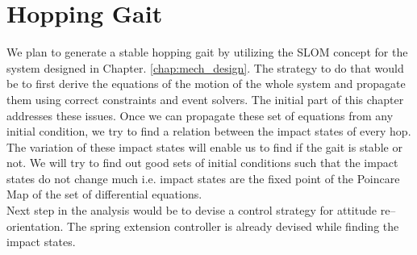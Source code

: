 \chapter{Hopping Gait}
\label{chap:hopping_gait}

We plan to generate a stable hopping gait by utilizing the SLOM concept for the system designed in Chapter. 
\ref{chap:mech_design}. The strategy to do that would be to first derive the equations of the motion of the 
whole system and propagate them using correct constraints and event solvers. The initial part of this 
chapter addresses these issues. Once we can propagate these set of equations from any initial condition, we 
try to find a relation between the impact states of every hop. The variation of these impact states will 
enable us to find if the gait is stable or not. We will try to find out good sets of initial conditions 
such that the impact states do not change much i.e. impact states are the fixed point of the Poincare Map 
of the set of differential equations.\\

Next step in the analysis would be to devise a control strategy for attitude re--orientation. The spring 
extension controller is already devised while finding the impact states.

